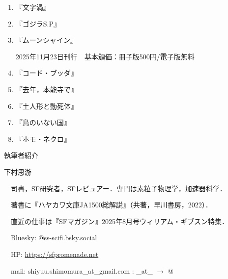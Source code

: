 \documentclass[10pt, a5paper, twoside]{ltjsarticle}
\theoremstyle{definition}
\begin{document}
\begin{enumerate}
		\item 『文字渦』

			\vspace{3mm}

		\item 『ゴジラS.P』

			\vspace{3mm}

		\item 『ムーンシャイン』

			2025年11月23日刊行　基本頒価：冊子版500円/電子版無料

		\item 『コード・ブッダ』

			\vspace{3mm}

		\item 『去年，本能寺で』

			\vspace{3mm}

		\item 『土人形と動死体』

			\vspace{3mm}

		\item 『鳥のいない国』

			\vspace{3mm}

		\item 『ホモ・ネクロ』

			\vspace{3mm}

	\end{enumerate}

	\newpage

	{\large 執筆者紹介}

	\vspace{3mm}

	下村思游

	　司書，SF研究者，SFレビュアー．専門は素粒子物理学，加速器科学．

	　著書に『ハヤカワ文庫JA1500総解説』（共著，早川書房，2022）．

	　直近の仕事は『SFマガジン』2025年8月号ウィリアム・ギブスン特集．

	　Bluesky: @ss-scifi.bsky.social

	　HP: \url{https://sfpromenade.net}

	　mail: shiyuu.shimomura\_at\_gmail.com : \_at\_ $\rightarrow$ @

	\vfill
\end{document}
